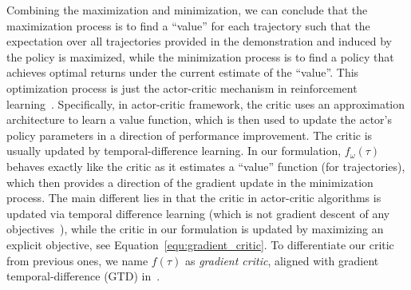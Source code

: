 % 
% 
% 

Combining the maximization and minimization,
we can conclude that the maximization process is to find a ``value'' for each trajectory such that the expectation over all trajectories provided in the demonstration and induced by the policy is maximized, 
while the minimization process is to find a policy that achieves optimal returns under the current estimate of the ``value''. 
This optimization process is just the actor-critic mechanism in reinforcement learning~\citep{konda2000actor}.
Specifically, in actor-critic framework, the critic uses an approximation architecture to learn a value function, which is then used to update the actor's policy parameters in a direction of performance improvement. The critic is usually updated by temporal-difference learning. In our formulation, $f_{\omega}(\tau)$ behaves exactly like the critic as it estimates a ``value'' function (for trajectories), which then provides a direction of the gradient update in the minimization process. 
The main different lies in that the critic in actor-critic algorithms is updated via temporal difference learning (which is not gradient descent of any objectives~\citep{sutton2008convergent}), 
while the critic in our formulation is updated by maximizing an explicit objective, see Equation~\ref{equ:gradient_critic}. 
To differentiate our critic from previous ones, we name $f(\tau)$ as \textit{gradient critic}, aligned with gradient temporal-difference (GTD) in~\citet{sutton2008convergent,sutton2009fast}. 

